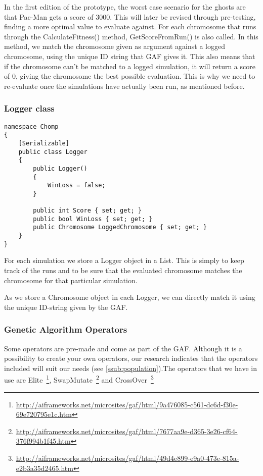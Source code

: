 In the first edition of the prototype, the worst case scenario for the ghosts are that Pac-Man gets a score of 3000. This will later be revised through pre-testing, finding a more optimal value to evaluate against.
For each chromosome that runs through the CalculateFitness() method, GetScoreFromRun() is also called. In this method, we match the chromosome given as argument against a logged chromosome, using the unique ID string that GAF gives it. This also means that if the chromosome can’t be matched to a logged simulation, it will return a score of 0, giving the chromosome the best possible evaluation. This is why we need to re-evaluate once the simulations have actually been run, as mentioned before.

\subsubsection*{Logger class}
\begin{lstlisting}[caption=Logger class and its constructor.,label=lst:logger]
namespace Chomp
{
	[Serializable]
	public class Logger
	{
		public Logger()
		{
			WinLoss = false;
		}

		public int Score { set; get; }
		public bool WinLoss { set; get; }
		public Chromosome LoggedChromosome { set; get; }
	}
}
\end{lstlisting}

For each simulation we store a Logger object in a List. This is simply to keep track of the runs and to be sure that the evaluated chromosome matches the chromosome for that particular simulation.

As we store a Chromosome object in each Logger, we can directly match it using the unique ID-string given by the GAF.

\subsubsection*{Genetic Algorithm Operators}
Some operators are pre-made and come as part of the GAF. Although it is a possibility to create your own operators, our research indicates that the operators included will suit our needs (see \ref{ssub:population}).The operators that we have in use are Elite~\footnote{\url{http://aiframeworks.net/microsites/gaf/html/9a476085-c561-dc6d-f30e-69e720795e1c.htm}}, SwapMutate~\footnote{\url{http://aiframeworks.net/microsites/gaf/html/7677aa9e-d365-3e26-cf64-376f994b1f45.htm}} and CrossOver~\footnote{\url{http://aiframeworks.net/microsites/gaf/html/49d4e899-e9a0-473e-815a-e2b3a35d2465.htm}}

